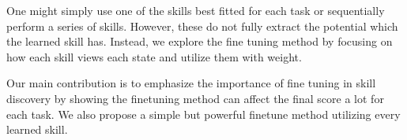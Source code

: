 One might simply use one of the skills best fitted for each task or sequentially 
perform a series of skills. However, these do not fully extract the potential which the learned skill has.
Instead, we explore the fine tuning method by focusing on how each skill views each state
and utilize them with weight.

Our main contribution is to emphasize the importance of fine tuning in skill discovery
by showing the finetuning method can affect the final score a lot for each task.
We also propose a simple but powerful finetune method utilizing every learned skill.